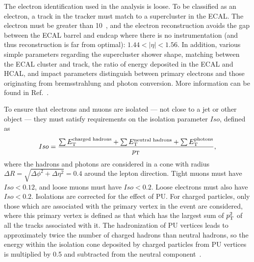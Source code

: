The electron identification used in the analysis is loose. To be classified as an electron, a track in the tracker must match to a supercluster in the \ac{ECAL}. 
The electron \pt must be greater than 10~\GeV{}, 
and the electron reconstruction avoids the gap between the \ac{ECAL} barrel and endcap where there is no instrumentation (and thus reconstruction is far from optimal): 
$1.44< |\eta| < 1.56 $. 
In addition, various simple parameters regarding the supercluster shower shape, matching between the \ac{ECAL} cluster and track, 
the ratio of energy deposited in the \ac{ECAL} and \ac{HCAL}, and impact parameters distinguish between primary electrons and those originating from bremsstrahlung and photon conversion. More information can be found in Ref.~\cite{CMS:elecReco}.

To ensure that electrons and muons are isolated --- not close to a jet or other object --- they must satisfy requirements on the isolation parameter $Iso$, defined as
\begin{equation}
Iso = \frac{\sum{\ET^{\text{charged hadrons}}}+ \sum{\ET^{\text{neutral hadrons}}}+ \sum{\ET^{\text{photons}}} }{\pt},
\end{equation} 
where the hadrons and photons are considered in a cone with radius $\Delta R=\sqrt{\Delta \phi ^{2} + \Delta \eta ^{2}}=0.4$ around the lepton direction.
Tight muons must have $Iso<0.12$, and loose muons must have $Iso<0.2$. 
Loose electrons must also have $Iso<0.2$.
Isolations are corrected for the effect of \ac{PU}. 
For charged particles, only those which are associated with the primary vertex in the event are considered, where this primary vertex is defined as that which has the largest sum of $p_{\text{T}}^{2}$ of all the tracks associated with it. 
The hadronization of \ac{PU} vertices leads to approximately twice 
the number of charged hadrons than neutral hadrons, 
so the energy within the isolation cone deposited by charged particles 
from \ac{PU} vertices is multiplied by 0.5 and subtracted from the neutral component~\cite{deltabeta_htautau7tev}.


